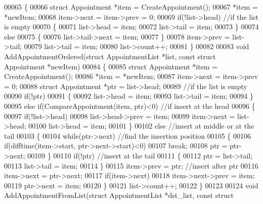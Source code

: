 \begin{DoxyCode}
00065 \{
00066     \textcolor{keyword}{struct }Appointment *item = CreateAppointment();
00067     *item = *newItem;
00068     item->next = item->prev = 0;
00069     \textcolor{keywordflow}{if}(!list->head) \textcolor{comment}{//if the list is empty}
00070     \{
00071         list->head = item;
00072         list->tail = item;
00073     \}
00074     \textcolor{keywordflow}{else}
00075     \{
00076         list->tail->next = item;
00077     \}
00078     item->prev = list->tail;
00079     list->tail = item;
00080     list->count++;
00081 \}
00082 
00083 \textcolor{keywordtype}{void} AddAppointmentOrdered(\textcolor{keyword}{struct} AppointmentList *list, \textcolor{keyword}{const} \textcolor{keyword}{struct} 
      Appointment *newItem)
00084 \{
00085     \textcolor{keyword}{struct }Appointment *item = CreateAppointment();
00086     *item = *newItem;
00087     item->next = item->prev = 0;
00088     \textcolor{keyword}{struct }Appointment *ptr = list->head;
00089     \textcolor{comment}{//if the list is empty}
00090     \textcolor{keywordflow}{if}(!ptr)
00091     \{
00092         list->head = item;
00093         list->tail = item;
00094     \}
00095     \textcolor{keywordflow}{else} \textcolor{keywordflow}{if}(CompareAppointment(item, ptr)<0)    \textcolor{comment}{//if insert at the head}
00096     \{
00097         \textcolor{keywordflow}{if}(!list->head)
00098             list->head->prev = item;
00099         item->next = list->head;
00100         list->head = item;
00101     \}
00102     \textcolor{keywordflow}{else}    \textcolor{comment}{//insert at middle or at the tail}
00103     \{
00104         \textcolor{keywordflow}{while}(ptr->next)    \textcolor{comment}{//find the insertion position}
00105         \{
00106             \textcolor{keywordflow}{if}(difftime(item->start, ptr->next->start)<0)
00107                 \textcolor{keywordflow}{break};
00108             ptr = ptr->next;
00109         \}
00110         \textcolor{keywordflow}{if}(!ptr)    \textcolor{comment}{//insert at the tail}
00111         \{
00112             ptr = list->tail;
00113             list->tail = item;
00114         \}
00115         item->prev = ptr;   \textcolor{comment}{//insert after ptr}
00116         item->next = ptr->next;
00117         \textcolor{keywordflow}{if}(item->next)
00118             item->next->prev = item;
00119         ptr->next = item;
00120     \}
00121     list->count++;
00122 \}
00123 
00124 \textcolor{keywordtype}{void} AddAppointmentFromList(\textcolor{keyword}{struct} AppointmentList *dst\_list, \textcolor{keyword}{const} \textcolor{keyword}{struct} 

\end{DoxyCode}
